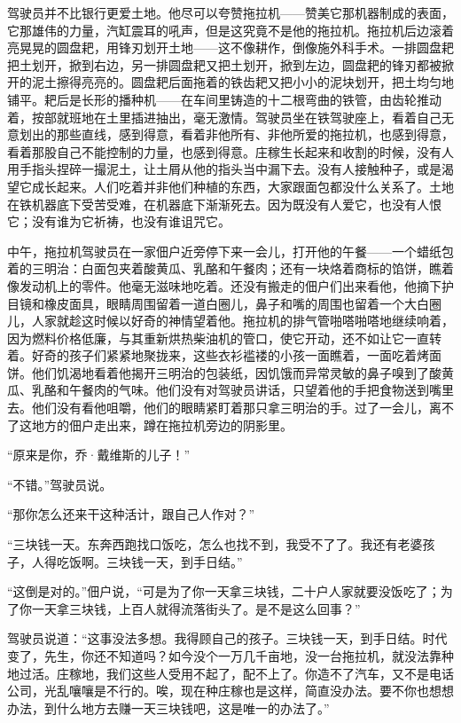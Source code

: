 \documentclass[12pt,UTF-8,openany]{ctexbook}
\begin{document}
    驾驶员并不比银行更爱土地。他尽可以夸赞拖拉机——赞美它那机器制成的表面，它那雄伟的力量，汽缸震耳的吼声，但是这究竟不是他的拖拉机。拖拉机后边滚着亮晃晃的圆盘耙，用锋刃划开土地——这不像耕作，倒像施外科手术。一排圆盘耙把土划开，掀到右边，另一排圆盘耙又把土划开，掀到左边，圆盘耙的锋刃都被掀开的泥土擦得亮亮的。圆盘耙后面拖着的铁齿耙又把小小的泥块划开，把土均匀地铺平。耙后是长形的播种机——在车间里铸造的十二根弯曲的铁管，由齿轮推动着，按部就班地在土里插进抽出，毫无激情。驾驶员坐在铁驾驶座上，看着自己无意划出的那些直线，感到得意，看着非他所有、非他所爱的拖拉机，也感到得意，看着那股自己不能控制的力量，也感到得意。庄稼生长起来和收割的时候，没有人用手指头捏碎一撮泥土，让土屑从他的指头当中漏下去。没有人接触种子，或是渴望它成长起来。人们吃着并非他们种植的东西，大家跟面包都没什么关系了。土地在铁机器底下受苦受难，在机器底下渐渐死去。因为既没有人爱它，也没有人恨它；没有谁为它祈祷，也没有谁诅咒它。
    
    中午，拖拉机驾驶员在一家佃户近旁停下来一会儿，打开他的午餐——一个蜡纸包着的三明治：白面包夹着酸黄瓜、乳酪和午餐肉；还有一块烙着商标的馅饼，瞧着像发动机上的零件。他毫无滋味地吃着。还没有搬走的佃户们出来看他，他摘下护目镜和橡皮面具，眼睛周围留着一道白圈儿，鼻子和嘴的周围也留着一个大白圈儿，人家就趁这时候以好奇的神情望着他。拖拉机的排气管啪嗒啪嗒地继续响着，因为燃料价格低廉，与其重新烘热柴油机的管口，使它开动，还不如让它一直转着。好奇的孩子们紧紧地聚拢来，这些衣衫褴褛的小孩一面瞧着，一面吃着烤面饼。他们饥渴地看着他揭开三明治的包装纸，因饥饿而异常灵敏的鼻子嗅到了酸黄瓜、乳酪和午餐肉的气味。他们没有对驾驶员讲话，只望着他的手把食物送到嘴里去。他们没有看他咀嚼，他们的眼睛紧盯着那只拿三明治的手。过了一会儿，离不了这地方的佃户走出来，蹲在拖拉机旁边的阴影里。
    
    “原来是你，乔·戴维斯的儿子！”
    
    “不错。”驾驶员说。
    
    “那你怎么还来干这种活计，跟自己人作对？”
    
    “三块钱一天。东奔西跑找口饭吃，怎么也找不到，我受不了了。我还有老婆孩子，人得吃饭啊。三块钱一天，到手日结。”
    
    “这倒是对的。”佃户说，“可是为了你一天拿三块钱，二十户人家就要没饭吃了；为了你一天拿三块钱，上百人就得流落街头了。是不是这么回事？”
    
    驾驶员说道：“这事没法多想。我得顾自己的孩子。三块钱一天，到手日结。时代变了，先生，你还不知道吗？如今没个一万几千亩地，没一台拖拉机，就没法靠种地过活。庄稼地，我们这些人受用不起了，配不上了。你造不了汽车，又不是电话公司，光乱嚷嚷是不行的。唉，现在种庄稼也是这样，简直没办法。要不你也想想办法，到什么地方去赚一天三块钱吧，这是唯一的办法了。”
    
\end{document}
